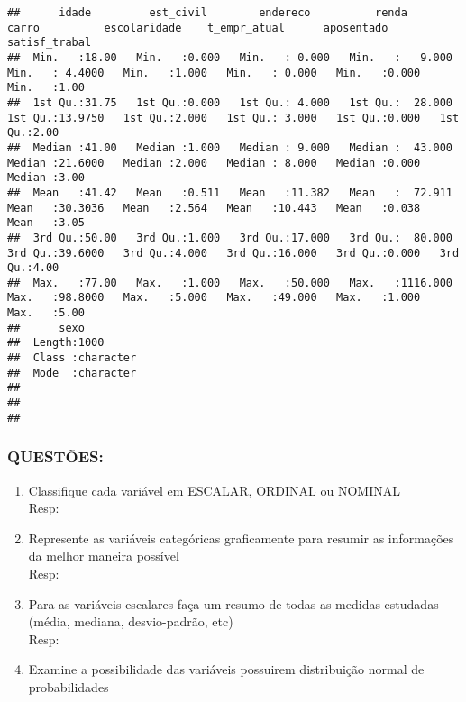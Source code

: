 \documentclass[
]{article}
\newenvironment{Shaded}{\begin{snugshade}}{\end{snugshade}}
\newcommand{\FunctionTok}[1]{\textcolor[rgb]{0.13,0.29,0.53}{\textbf{#1}}}
\newcommand{\NormalTok}[1]{#1}
\newcommand{\SpecialCharTok}[1]{\textcolor[rgb]{0.81,0.36,0.00}{\textbf{#1}}}
\begin{document}
\begin{verbatim}
##      idade         est_civil        endereco          renda              carro          escolaridade    t_empr_atual      aposentado    satisf_trabal 
##  Min.   :18.00   Min.   :0.000   Min.   : 0.000   Min.   :   9.000   Min.   : 4.4000   Min.   :1.000   Min.   : 0.000   Min.   :0.000   Min.   :1.00  
##  1st Qu.:31.75   1st Qu.:0.000   1st Qu.: 4.000   1st Qu.:  28.000   1st Qu.:13.9750   1st Qu.:2.000   1st Qu.: 3.000   1st Qu.:0.000   1st Qu.:2.00  
##  Median :41.00   Median :1.000   Median : 9.000   Median :  43.000   Median :21.6000   Median :2.000   Median : 8.000   Median :0.000   Median :3.00  
##  Mean   :41.42   Mean   :0.511   Mean   :11.382   Mean   :  72.911   Mean   :30.3036   Mean   :2.564   Mean   :10.443   Mean   :0.038   Mean   :3.05  
##  3rd Qu.:50.00   3rd Qu.:1.000   3rd Qu.:17.000   3rd Qu.:  80.000   3rd Qu.:39.6000   3rd Qu.:4.000   3rd Qu.:16.000   3rd Qu.:0.000   3rd Qu.:4.00  
##  Max.   :77.00   Max.   :1.000   Max.   :50.000   Max.   :1116.000   Max.   :98.8000   Max.   :5.000   Max.   :49.000   Max.   :1.000   Max.   :5.00  
##      sexo          
##  Length:1000       
##  Class :character  
##  Mode  :character  
##                    
##                    
## 
\end{verbatim}

\hypertarget{questuxf5es}{%
\subsubsection{QUESTÕES:}\label{questuxf5es}}

\begin{enumerate}
\def\labelenumi{\alph{enumi})}
\item
  Classifique cada variável em ESCALAR, ORDINAL ou NOMINAL\\
  Resp:
\item
  Represente as variáveis categóricas graficamente para resumir as
  informações da melhor maneira possível\\
  Resp:
\item
  Para as variáveis escalares faça um resumo de todas as medidas
  estudadas (média, mediana, desvio-padrão, etc)\\
  Resp:
\item
  Examine a possibilidade das variáveis possuirem distribuição normal de
  probabilidades
\end{enumerate}

\begin{Shaded}
\end{Shaded}
\end{document}
